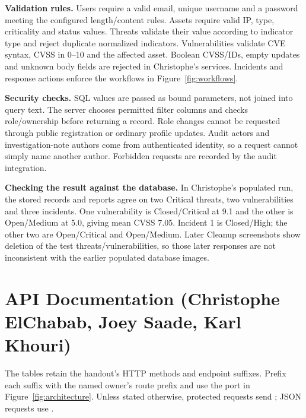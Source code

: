 \documentclass[11pt,a4paper]{article}
\begin{document}
\textbf{Validation rules.} Users require a valid email, unique username and a password meeting the configured length/content rules. Assets require valid IP, type, criticality and status values. Threats validate their value according to indicator type and reject duplicate normalized indicators. Vulnerabilities validate CVE syntax, CVSS in 0--10 and the affected asset. Boolean CVSS/IDs, empty updates and unknown body fields are rejected in Christophe's services. Incidents and response actions enforce the workflows in Figure~\ref{fig:workflows}.

\textbf{Security checks.} SQL values are passed as bound parameters, not joined into query text. The server chooses permitted filter columns and checks role/ownership before returning a record. Role changes cannot be requested through public registration or ordinary profile updates. Audit actors and investigation-note authors come from authenticated identity, so a request cannot simply name another author. Forbidden requests are recorded by the audit integration.

\textbf{Checking the result against the database.} In Christophe's populated run, the stored records and reports agree on two Critical threats, two vulnerabilities and three incidents. One vulnerability is Closed/Critical at 9.1 and the other is Open/Medium at 5.0, giving mean CVSS 7.05. Incident 1 is Closed/High; the other two are Open/Critical and Open/Medium. Later Cleanup screenshots show deletion of the test threats/vulnerabilities, so those later responses are not inconsistent with the earlier populated database images.

\section{API Documentation (Christophe ElChabab, Joey Saade, Karl Khouri)}
\label{sec:api}
The tables retain the handout's HTTP methods and endpoint suffixes. Prefix each suffix with the named owner's route prefix and use the port in Figure~\ref{fig:architecture}. Unless stated otherwise, protected requests send ; JSON requests use .
\end{document}
